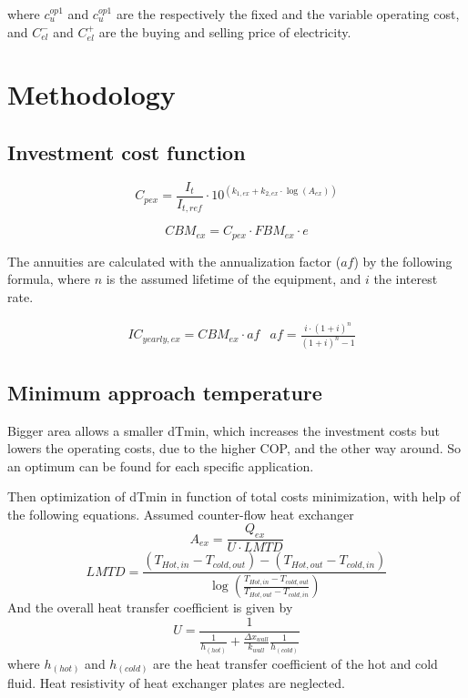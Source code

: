 \documentclass{article}
\begin{document}
where $c_{u}^{op1}$ and $c_{u}^{op1}$ are the respectively the fixed and the variable operating cost, and $C_{el}^{-}$ and $C_{el}^{+}$ are the buying and selling price of electricity.


\section{Methodology}

\subsection{Investment cost function}
\begin{equation}
C_{pex} = \frac{I_{t}}{I_{t,ref}} \cdot 10^ {(k_{1,ex} + k_{2,ex} \cdot \log(A_{ex}))}
\end{equation}

\begin{equation}
CBM_{ex} = C_{pex} \cdot FBM_{ex} \cdot e 
\end{equation}

The annuities are calculated with the annualization factor ($af$) by the following formula, where $n$ is the assumed lifetime of the equipment, and $i$ the interest rate. 

\begin{align}
	& IC_{yearly,ex} = CBM_{ex} \cdot af 
	& af = \frac{i \cdot (1 + i)^n}{(1 + i)^n - 1}
\end{align}

\subsection{Minimum approach temperature}
Bigger area allows a smaller dTmin, which increases the investment costs but lowers the operating costs, due to the higher COP, and the other way around. So an optimum can be found for each specific application.

Then optimization of dTmin in function of total costs minimization, with help of the following equations. Assumed counter-flow heat exchanger 
\begin{equation}\label{eq:HEX_area}
    A_{ex} = \frac{Q_{ex}}{U \cdot LMTD}
\end{equation}
\begin{equation}\label{eq:LMTD}
    LMTD= \frac{(T_{Hot,in } - T_{cold,out }) - (T_{Hot,out } - T_{cold,in }) }{ \log{ (\frac{T_{Hot,in } - T_{cold,out }}{T_{Hot,out } - T_{cold,in }} ) }}
\end{equation}
And the overall heat transfer coefficient is given by \cite{huExtremumSeekingControl2015}
\begin{equation}\label{eq:alpha}
    U= \frac{1}{ \frac{1}{h_{(hot)} } + \frac{\Delta x_{wall}}{k_{wall}} \frac{1}{h_{(cold)}} }
\end{equation}
where $h_{(hot)}$ and $h_{(cold)}$ are the heat transfer coefficient of the hot and cold fluid. Heat resistivity of heat exchanger plates are neglected.
\end{document}
